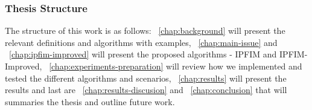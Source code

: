 \subsubsection{Thesis Structure}
The structure of this work is as follows: ~\autoref{chap:background} will present the relevant definitions and algorithms with examples, ~\autoref{chap:main-issue} and ~\autoref{chap:ipfim-improved} will present the proposed algorithms - IPFIM and IPFIM-Improved, ~\autoref{chap:experiments-preparation} will review how we implemented and tested the different algorithms and scenarios, ~\autoref{chap:results} will present the results and last are ~\autoref{chap:results-discusion} and ~\autoref{chap:conclusion} that will summaries the thesis and outline future work.
